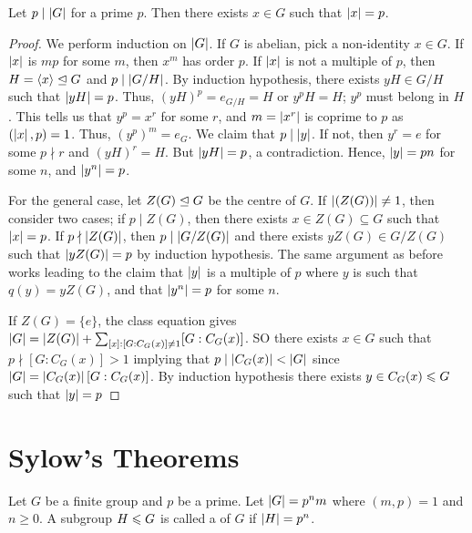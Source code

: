 \begin{theorem}
    Let $p \mid \left| G \right|$ for a prime $p$. Then there exists $x \in G$ such that $\left| x \right|=p$.
\end{theorem}
\begin{proof}
    We perform induction on $\left| G \right|$. If $G$ is abelian, pick a non-identity $x \in G$. If $\left| x \right|$ is $mp$ for some $m$, then $x^{m}$ has order $p$. If $\left| x \right|$ is not a multiple of $p$, then $H = \langle x\rangle \trianglelefteq G$ and $p \mid \left| G/H \right|$. By induction hypothesis, there exists $yH \in G/H$ such that $\left| yH \right| = p$. Thus, $(yH)^{p} = e_{G/H} = H$ or $y^{p}H = H$; $y^{p}$ must belong in $H$. This tells us that $y^{p} = x^{r}$ for some $r$, and $m = \left| x^{r} \right|$ is coprime to $p$ as $(\left| x \right|,p) = 1$. Thus, $(y^{p})^{m} = e_{G}$. We claim that $p \mid \left| y \right|$. If not, then $y^{r} = e$ for some $p \nmid r$ and $(yH)^{r} = H$. But $\left| yH \right| = p$, a contradiction. Hence, $\left| y \right| = pn$ for some $n$, and $\left| y^{n} \right| = p$.

    For the general case, let $Z(G) \trianglelefteq G$ be the centre of $G$. If $\left| (Z(G)) \right| \neq 1$, then consider two cases; if $p \mid Z(G)$, then there exists $x \in Z(G) \subseteq G$ such that $\left| x \right| = p$. If $p \nmid \left| Z(G) \right|$, then $p \mid \left| G/Z(G) \right|$ and there exists $yZ(G) \in G/Z(G)$ such that $\left| yZ(G) \right| = p$ by induction hypothesis. The same argument as before works leading to the claim that $\left| y \right|$ is a multiple of $p$ where $y$ is such that $q(y) = yZ(G)$, and that $\left| y^{n} \right| = p$ for some $n$.

    If $Z(G) = \{e\}$, the class equation gives $\left| G \right| = \left| Z(G) \right| + \sum_{[x]:[G:C_G(x)]\neq 1} [G:C_G(x)]$. SO there exists $x \in G$ such that $p \nmid [G:C_{G}(x)] > 1$ implying that $p \mid \left| C_{G}(x) \right| < \left| G \right|$ since $\left| G \right| = \left| C_{G}(x) \right|[G:C_{G}(x)]$. By induction hypothesis there exists $y \in C_{G}(x) \leqslant G$ such that $\left| y \right| = p$
\end{proof}

\section{Sylow's Theorems}

\begin{definition}
    Let $G$ be a finite group and $p$ be a prime. Let $\left| G \right| = p^{n}m$ where $(m,p) = 1$ and $n \geq 0$. A subgroup $H \leqslant G$ is called a  of $G$ if $\left| H \right|=p^{n}$.
\end{definition}

